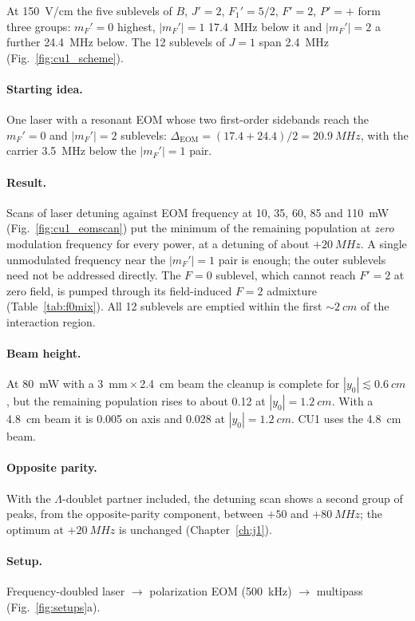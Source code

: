 \documentclass[11pt,a4paper,oneside]{report}
\begin{document}
At \SI{150}{V/cm} the five sublevels of $B$, $J'=2$, $F_1'=5/2$, $F'=2$, $P'=+$ form three
groups: $m_F'=0$ highest, $|m_F'|=1$ \SI{17.4}{MHz} below it and $|m_F'|=2$ a further
\SI{24.4}{MHz} below. The 12 sublevels of $J=1$ span \SI{2.4}{MHz} (Fig.~\ref{fig:cu1_scheme}).

\paragraph{Starting idea.} One laser with a resonant EOM whose two first-order sidebands reach
the $m_F'=0$ and $|m_F'|=2$ sublevels: $\Delta_{\mathrm{EOM}}=(17.4+24.4)/2=\SI{20.9}{MHz}$,
with the carrier \SI{3.5}{MHz} below the $|m_F'|=1$ pair.

\paragraph{Result.} Scans of laser detuning against EOM frequency at 10, 35, 60, 85 and
\SI{110}{mW} (Fig.~\ref{fig:cu1_eomscan}) put the minimum of the remaining population at
\emph{zero} modulation frequency for every power, at a detuning of about $+\SI{20}{MHz}$.
A single unmodulated frequency near the $|m_F'|=1$ pair is enough; the outer sublevels need
not be addressed directly. The $F=0$ sublevel, which cannot reach $F'=2$ at zero field, is
pumped through its field-induced $F=2$ admixture (Table~\ref{tab:f0mix}). All 12 sublevels
are emptied within the first $\sim\SI{2}{cm}$ of the interaction region.

\paragraph{Beam height.} At \SI{80}{mW} with a \SI{3}{mm}\,$\times$\,\SI{2.4}{cm} beam the
cleanup is complete for $|y_0|\lesssim\SI{0.6}{cm}$, but the remaining population rises to
about 0.12 at $|y_0|=\SI{1.2}{cm}$. With a \SI{4.8}{cm} beam it is 0.005 on axis and 0.028 at
$|y_0|=\SI{1.2}{cm}$. CU1 uses the \SI{4.8}{cm} beam.

\paragraph{Opposite parity.} With the $\Lambda$-doublet partner included, the detuning scan
shows a second group of peaks, from the opposite-parity component, between $+50$ and
$+\SI{80}{MHz}$; the optimum at $+\SI{20}{MHz}$ is unchanged (Chapter~\ref{ch:j1}).

\paragraph{Setup.} Frequency-doubled laser $\to$ polarization EOM (\SI{500}{kHz}) $\to$
multipass (Fig.~\ref{fig:setups}a).
\end{document}
